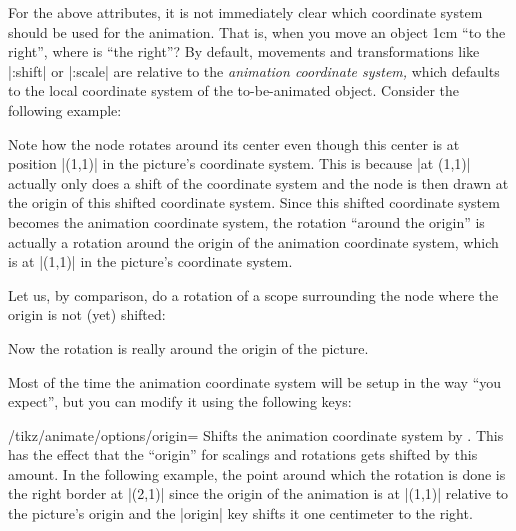 For the above attributes, it is not immediately clear which coordinate system
should be used for the animation. That is, when you move an object 1cm ``to the
right'', where is ``the right''? By default, movements and transformations like
|:shift| or |:scale| are relative to the \emph{animation coordinate system,}
which defaults to the local coordinate system of the to-be-animated object.
Consider the following example:
%
\begin{codeexample}[
    preamble={\usetikzlibrary{animations}},
    animation list={0.5,1,1.5,2},
]
\end{codeexample}
%
Note how the node rotates around its center even though this center is at
position |(1,1)| in the picture's coordinate system. This is because |at (1,1)|
actually only does a shift of the coordinate system and the node is then drawn
at the origin of this shifted coordinate system. Since this shifted coordinate
system becomes the animation coordinate system, the rotation ``around the
origin'' is actually a rotation around the origin of the animation coordinate
system, which is at |(1,1)| in the picture's coordinate system.

Let us, by comparison, do a rotation of a scope surrounding the node where the
origin is not (yet) shifted:
%
\begin{codeexample}[
    preamble={\usetikzlibrary{animations}},
    animation list={0.5,1,1.5,2},
]
\end{codeexample}
%
Now the rotation is really around the origin of the picture.

Most of the time the animation coordinate system will be setup in the way ``you
expect'', but you can modify it using the following keys:

\begin{key}{/tikz/animate/options/origin=}
    Shifts the animation coordinate system by . This has the
    effect that the ``origin'' for scalings and rotations gets shifted by this
    amount. In the following example, the point around which the rotation is
    done is the right border at |(2,1)| since the origin of the animation is at
    |(1,1)| relative to the picture's origin and the |origin| key shifts it one
    centimeter to the right.
\begin{codeexample}[
    preamble={\usetikzlibrary{animations}},
    animation list={0.5,1,1.5,2},
]
\end{codeexample}
\end{key}

